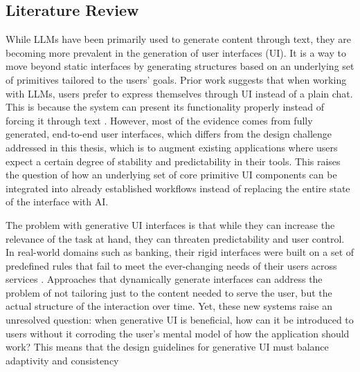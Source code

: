 \subsection{Literature Review}

While LLMs have been primarily used to generate content through text, they are becoming more prevalent in the generation of user interfaces (UI). It is a way to move beyond static interfaces by generating structures based on an underlying set of primitives tailored to the users' goals. Prior work suggests that when working with LLMs, users prefer to express themselves through UI instead of a plain chat. This is because the system can present its functionality properly instead of forcing it through text \parencite{Leviathan2025GenerativeUI,Tang2025SurveyGUI,Ahmed2025LLMUIUX}. However, most of the evidence comes from fully generated, end-to-end user interfaces, which differs from the design challenge addressed in this thesis, which is to augment existing applications where users expect a certain degree of stability and predictability in their tools. This raises the question of how an underlying set of core primitive UI components can be integrated into already established workflows instead of replacing the entire state of the interface with AI.

The problem with generative UI interfaces is that while they can increase the relevance of the task at hand, they can threaten predictability and user control. In real-world domains such as banking, their rigid interfaces were built on a set of predefined rules that fail to meet the ever-changing needs of their users across services \parencite{Tambi2020GenerativeBanking}. Approaches that dynamically generate interfaces can address the problem of not tailoring just to the content needed to serve the user, but the actual structure of the interaction over time. Yet, these new systems raise an unresolved question: when generative UI is beneficial, how can it be introduced to users without it corroding the user's mental model of how the application should work? This means that the design guidelines for generative UI must balance adaptivity and consistency \parencite{Bieniek2024GenerativeAI}

